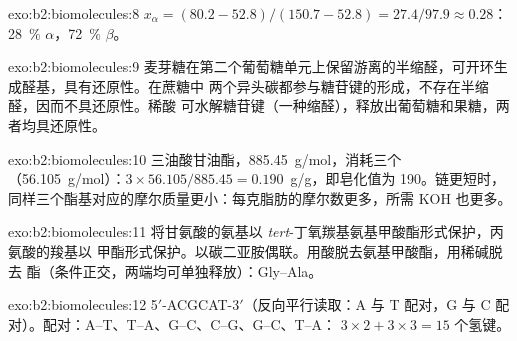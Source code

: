 \begin{solution}{exo:b2:biomolecules:8}
$x_\alpha = (80.2 - 52.8)/(150.7 - 52.8) = 27.4/97.9 \approx 0.28$：28~\% $\alpha$，72~\% $\beta$。
\end{solution}

\begin{solution}{exo:b2:biomolecules:9}
麦芽糖在第二个葡萄糖单元上保留游离的半缩醛，可开环生成醛基，具有还原性。在蔗糖中
两个异头碳都参与糖苷键的形成，不存在半缩醛，因而不具还原性。稀酸
可水解糖苷键（一种缩醛），释放出葡萄糖和果糖，两者均具还原性。
\end{solution}

\begin{solution}{exo:b2:biomolecules:10}
三油酸甘油酯，\qty{885.45}{g/mol}，消耗三个 （\qty{56.105}{g/mol}）：$3 \times 56.105/885.45 =
0.190$~g/g，即皂化值为 190。链更短时，
同样三个酯基对应的摩尔质量更小：每克脂肪的摩尔数更多，所需 KOH 也更多。
\end{solution}

\begin{solution}{exo:b2:biomolecules:11}
将甘氨酸的氨基以 \textit{tert}-丁氧羰基氨基甲酸酯形式保护，丙氨酸的羧基以
甲酯形式保护。以碳二亚胺偶联。用酸脱去氨基甲酸酯，用稀碱脱去
酯（条件正交，两端均可单独释放）：Gly--Ala。
\end{solution}

\begin{solution}{exo:b2:biomolecules:12}
5$'$-ACGCAT-3$'$（反向平行读取：A 与 T 配对，G 与 C 配对）。配对：A--T、T--A、G--C、C--G、G--C、T--A：
$3 \times 2 + 3 \times 3 = 15$ 个氢键。
\end{solution}

